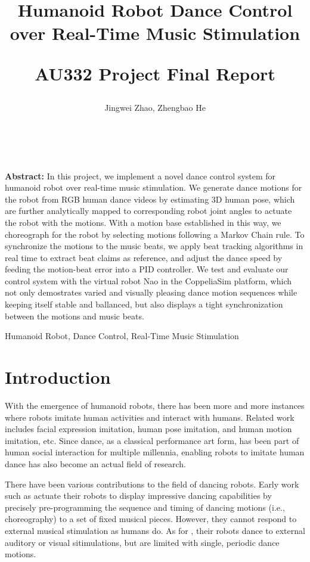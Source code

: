 \documentclass[UTF8,a4paper]{article}
\title{Humanoid Robot Dance Control \\ over Real-Time Music Stimulation \\ [1ex] \begin{large} AU332 Project Final Report \end{large} }
\author{%
	{Jingwei Zhao,  Zhengbao He}\\
	\affaddr{Shanghai Jiao Tong University, Shanghai, China}\\
	\affaddr{\{zhaojw, lstefanie\}@sjtu.edu.cn}\\
}
\newenvironment{csmtAbstract}{\noindent \kaishu \small {\bfseries Abstract:}}{}
\newenvironment{keywords}{\small \noindent{\bfseries Key Words:}}{}
\begin{document}
	
	\maketitle
	
	\begin{csmtAbstract}
		In this project, we implement a novel dance control system for humanoid robot over real-time music stimulation. We generate dance motions for the robot from RGB human dance videos by estimating 3D human pose, which are further analytically mapped to corresponding robot joint angles to actuate the robot with the motions. With a motion base established in this way, we choreograph for the robot by selecting motions following a Markov Chain rule. To synchronize the motions to the music beats, we apply beat tracking algorithms in real time to extract beat claims as reference, and adjust the dance speed by feeding the motion-beat error into a PID controller. We test and evaluate our control system with the virtual robot Nao in the CoppeliaSim platform, which not only demostrates varied and visually pleasing dance motion sequences while keeping itself stable and ballanced, but also displays a tight synchronization between the motions and music beats.
	\end{csmtAbstract}
	
	\begin{keywords}
		Humanoid Robot, Dance Control, Real-Time Music Stimulation
	\end{keywords}
	
	\section{Introduction}
	
	\noindent With the emergence of humanoid robots, there has been more and more instances where robots imitate human activities and interact with humans. Related work includes facial expression imitation\cite{ge2008facial}, human pose imitation\cite{zhang2018real, lei2015whole, zhangreal}, and human motion imitation\cite{kim2009stable, nakaoka2003generating, koenemann2014real}, etc. Since dance, as a classical performance art form, has been part of human social interaction for multiple millennia, enabling robots to imitate human dance has also become an actual field of research.

	There have been various contributions to the field of dancing robots. Early work such as \cite{geppert2004qrio, nakaoka2005task} actuate their robots to display impressive dancing capabilities by precisely pre-programming the sequence and timing of dancing motions (i.e., choreography) to a set of fixed musical pieces. However, they cannot respond to external musical stimulation as humans do. As for \cite{crick2006synchronization, bock2016robod, murata2008robot, schollig2010synchronizing}, their robots dance to external auditory or visual sitimulations, but are limited with single, periodic dance motions. 
	
\end{document}

